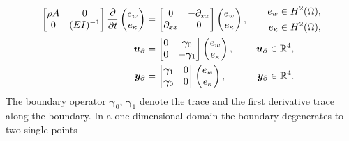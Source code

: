 \begin{subequations}\label{eq:pHlinsys_EB1}
\begin{align}
\begin{bmatrix}
\rho A & 0 \\
0 &(EI)^{-1} \\
\end{bmatrix}
\diffp{}{t}\begin{pmatrix}
e_w \\ e_\kappa \\
\end{pmatrix} &= \begin{bmatrix}
0 & -\partial_{xx} \\
\partial_{xx} & 0 \\
\end{bmatrix} \begin{pmatrix}
e_w \\ e_\kappa \\
\end{pmatrix}, \qquad \begin{aligned}
e_w \in H^2(\Omega), \\
e_\kappa \in H^2(\Omega), \\
\end{aligned} \label{eq:pHdyn_EB1}\\
\bm{u}_\partial &= \begin{bmatrix}
0 &\bm\gamma_{0} \\
0 &-\bm\gamma_{1} 
\end{bmatrix} \begin{pmatrix}
e_w \\ e_\kappa \\
\end{pmatrix}, \qquad \; \bm{u}_\partial \in \mathbb{R}^4,  \\
\bm{y}_\partial &= \begin{bmatrix}
\bm\gamma_{1} & 0\\
\bm\gamma_{0} & 0 
\end{bmatrix} \begin{pmatrix}
e_w \\ e_\kappa \\
\end{pmatrix}, \qquad \quad \, \bm{y}_\partial \in \mathbb{R}^4.
\end{align}
\end{subequations}
The boundary operator $\bm\gamma_0, \, \bm\gamma_{1}$ denote the trace and the first derivative trace along the boundary. In a one-dimensional domain the boundary degenerates to two single points

